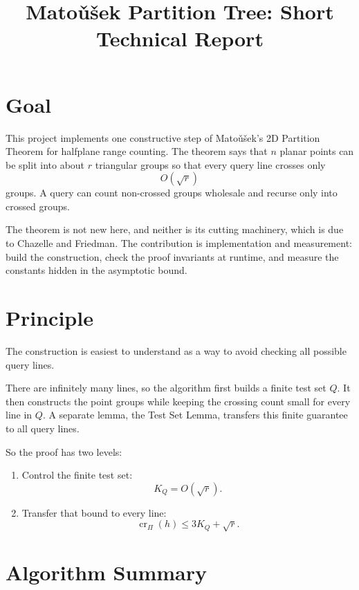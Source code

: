 \documentclass[10pt,a4paper]{article}
\title{Mato\v{u}\v{s}ek Partition Tree: Short Technical Report}
\author{}
\date{}
\begin{document}
\maketitle
\vspace{-1.2em}

\section*{Goal}

This project implements one constructive step of Mato\v{u}\v{s}ek's
2D Partition Theorem for halfplane range counting. The theorem says
that $n$ planar points can be split into about $r$ triangular groups
so that every query line crosses only
\[
  O(\sqrt r)
\]
groups. A query can count non-crossed groups wholesale and recurse
only into crossed groups.

The theorem is not new here, and neither is its cutting machinery,
which is due to Chazelle and Friedman. The contribution is
implementation and measurement: build the construction, check the
proof invariants at runtime, and measure the constants hidden in the
asymptotic bound.

\section*{Principle}

The construction is easiest to understand as a way to avoid checking
all possible query lines.

There are infinitely many lines, so the algorithm first builds a
finite test set $Q$. It then constructs the point groups while keeping
the crossing count small for every line in $Q$. A separate lemma, the
Test Set Lemma, transfers this finite guarantee to all query lines.

So the proof has two levels:

\begin{enumerate}
  \item Control the finite test set:
        \[
          K_Q=O(\sqrt r).
        \]
  \item Transfer that bound to every line:
        \[
          \operatorname{cr}_\Pi(h)\le 3K_Q+\sqrt r.
        \]
\end{enumerate}

\section*{Algorithm Summary}
\end{document}
